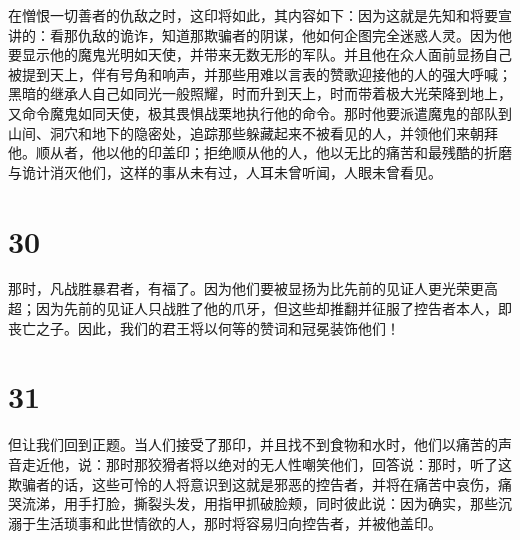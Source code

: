 在憎恨一切善者的仇敌之时，这印将如此，其内容如下：因为这就是先知和将要宣讲的：看那仇敌的诡诈，知道那欺骗者的阴谋，他如何企图完全迷惑人灵。因为他要显示他的魔鬼光明如天使，并带来无数无形的军队。并且他在众人面前显扬自己被提到天上，伴有号角和响声，并那些用难以言表的赞歌迎接他的人的强大呼喊；黑暗的继承人自己如同光一般照耀，时而升到天上，时而带着极大光荣降到地上，又命令魔鬼如同天使，极其畏惧战栗地执行他的命令。那时他要派遣魔鬼的部队到山间、洞穴和地下的隐密处，追踪那些躲藏起来不被看见的人，并领他们来朝拜他。顺从者，他以他的印盖印；拒绝顺从他的人，他以无比的痛苦和最残酷的折磨与诡计消灭他们，这样的事从未有过，人耳未曾听闻，人眼未曾看见。\par


\section{30}

那时，凡战胜暴君者，有福了。因为他们要被显扬为比先前的见证人更光荣更高超；因为先前的见证人只战胜了他的爪牙，但这些却推翻并征服了控告者本人，即丧亡之子。因此，我们的君王将以何等的赞词和冠冕装饰他们！\par


\section{31}

但让我们回到正题。当人们接受了那印，并且找不到食物和水时，他们以痛苦的声音走近他，说：那时那狡猾者将以绝对的无人性嘲笑他们，回答说：那时，听了这欺骗者的话，这些可怜的人将意识到这就是邪恶的控告者，并将在痛苦中哀伤，痛哭流涕，用手打脸，撕裂头发，用指甲抓破脸颊，同时彼此说：因为确实，那些沉溺于生活琐事和此世情欲的人，那时将容易归向控告者，并被他盖印。\par

